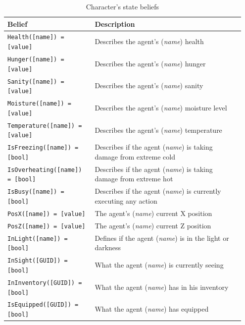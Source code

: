 \begin{table}[htb]
	\centering
    \caption{Character's state beliefs}
    \label{tab:state-beliefs}
    \begin{tabular}{ | p{0.35\linewidth} | p{0.6\linewidth} | }
        \hline 
        \textbf{Belief} & \textbf{Description} \\ \hline \hline
        \texttt{Health([name]) = [value]} & Describes the agent's (\textit{name}) health \\ \hline
        \texttt{Hunger([name]) = [value]} & Describes the agent's (\textit{name}) hunger \\ \hline
        \texttt{Sanity([name]) = [value]} & Describes the agent's (\textit{name}) sanity \\ \hline
        \texttt{Moisture([name]) = [value]} & Describes the agent's (\textit{name}) moisture level \\ \hline
        \texttt{Temperature([name]) = [value]} & Describes the agent's (\textit{name}) temperature \\ \hline
        \texttt{IsFreezing([name]) = [bool]} & Describes if the agent (\textit{name}) is taking damage from extreme cold \\ \hline
        \texttt{IsOverheating([name]) = [bool]} & Describes if the agent (\textit{name}) is taking damage from extreme hot \\ \hline
        \texttt{IsBusy([name]) = [bool]} & Describes if the agent (\textit{name}) is currently executing any action \\ \hline
        \texttt{PosX([name]) = [value]} & The agent's (\textit{name}) current X position \\ \hline
        \texttt{PosZ([name]) = [value]} & The agent's (\textit{name}) current Z position \\ \hline
        \texttt{InLight([name]) = [bool]} & Defines if the agent (\textit{name}) is in the light or darkness \\ \hline
        \texttt{InSight([GUID]) = [bool]} & What the agent (\textit{name}) is currently seeing \\ \hline
        \texttt{InInventory([GUID]) = [bool]} & What the agent (\textit{name}) has in his inventory \\ \hline
        \texttt{IsEquipped([GUID]) = [bool]} & What the agent (\textit{name}) has equipped \\ \hline
    \end{tabular}
\end{table}

